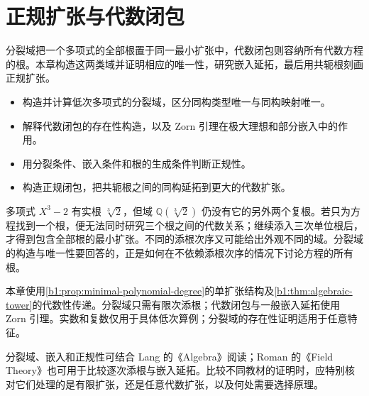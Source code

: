 
\chapter{正规扩张与代数闭包}
\label{b1:ch:15}

\begin{chapterabstract}
	分裂域把一个多项式的全部根置于同一最小扩张中，代数闭包则容纳所有代数方程的根。本章构造这两类域并证明相应的唯一性，研究嵌入延拓，最后用共轭根刻画正规扩张。
\end{chapterabstract}

\begin{learninggoals}
	\begin{itemize}
		\item 构造并计算低次多项式的分裂域，区分同构类型唯一与同构映射唯一。
		\item 解释代数闭包的存在性构造，以及 Zorn 引理在极大理想和部分嵌入中的作用。
		\item 用分裂条件、嵌入条件和根的生成条件判断正规性。
		\item 构造正规闭包，把共轭根之间的同构延拓到更大的代数扩张。
	\end{itemize}
\end{learninggoals}

多项式 \(X^3-2\) 有实根 \(\sqrt[3]{2}\)，但域 \(\mathbb Q(\sqrt[3]{2})\) 仍没有它的另外两个复根。若只为方程找到一个根，便无法同时研究三个根之间的代数关系；继续添入三次单位根后，才得到包含全部根的最小扩张。不同的添根次序又可能给出外观不同的域。分裂域的构造与唯一性要回答的，正是如何在不依赖添根次序的情况下讨论方程的所有根。

\ProseParagraphBreak

本章使用\cref{b1:prop:minimal-polynomial-degree}的单扩张结构及\cref{b1:thm:algebraic-tower}的代数性传递。分裂域只需有限次添根；代数闭包与一般嵌入延拓使用 Zorn 引理。实数和复数仅用于具体低次算例；分裂域的存在性证明适用于任意特征。

\ProseParagraphBreak
分裂域、嵌入和正规性可结合 Lang 的《Algebra》\cite[Chapter V, \S\S 2--4]{Lang2002}阅读；Roman 的《Field Theory》\cite[Sections 2.7--2.9, 3.1--3.2]{Roman2006FieldTheory}也可用于比较逐次添根与嵌入延拓。比较不同教材的证明时，应特别核对它们处理的是有限扩张，还是任意代数扩张，以及何处需要选择原理。






